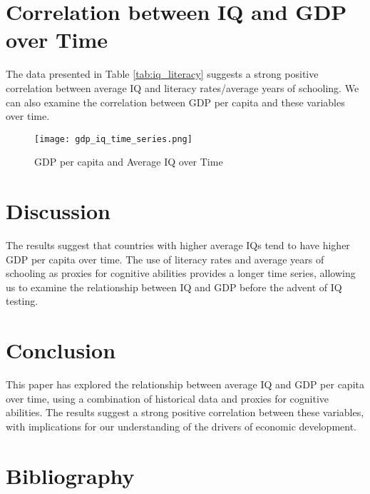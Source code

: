 \documentclass{article}
\begin{document}
\section{Correlation between IQ and GDP over Time}

The data presented in Table \ref{tab:iq_literacy} suggests a strong positive correlation between average IQ and literacy rates/average years of schooling. We can also examine the correlation between GDP per capita and these variables over time.

\begin{figure}[h!]
\centering
\texttt{[image: gdp\_iq\_time\_series.png]}
\caption{GDP per capita and Average IQ over Time}
\label{fig:gdp_iq_time_series}
\end{figure}

\section{Discussion}

The results suggest that countries with higher average IQs tend to have higher GDP per capita over time. The use of literacy rates and average years of schooling as proxies for cognitive abilities provides a longer time series, allowing us to examine the relationship between IQ and GDP before the advent of IQ testing.

\section{Conclusion}

This paper has explored the relationship between average IQ and GDP per capita over time, using a combination of historical data and proxies for cognitive abilities. The results suggest a strong positive correlation between these variables, with implications for our understanding of the drivers of economic development.

\section{Bibliography}



\end{document}
